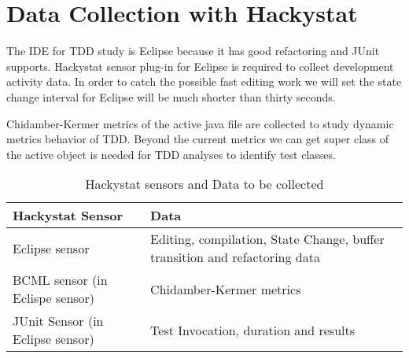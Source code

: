 
\chapter{Data Collection with Hackystat}

The IDE for TDD study is Eclipse because it has good refactoring and
JUnit supports. Hackystat sensor plug-in for Eclipse is required to
collect development activity data. In order to catch the possible fast
editing work we will set the state change interval for Eclipse will be much
shorter than thirty seconds.

Chidamber-Kermer metrics of the active java file are collected to study
dynamic metrics behavior of TDD. Beyond the current metrics we can get
super class of the active object is needed for TDD analyses to identify
test classes. 

\begin{table}[!ht]
\caption{Hackystat sensors and Data to be collected}
\begin{tabular}{|l|l|}
\hline Hackystat Sensor & Data \\
\hline Eclipse sensor & Editing, compilation, State Change, buffer
transition and refactoring data \\
\hline BCML sensor (in Eclispe sensor) & Chidamber-Kermer metrics  \\
\hline JUnit Sensor (in Eclipse sensor)& Test Invocation, duration and results \\
\hline
\end{tabular}
\end{table}










